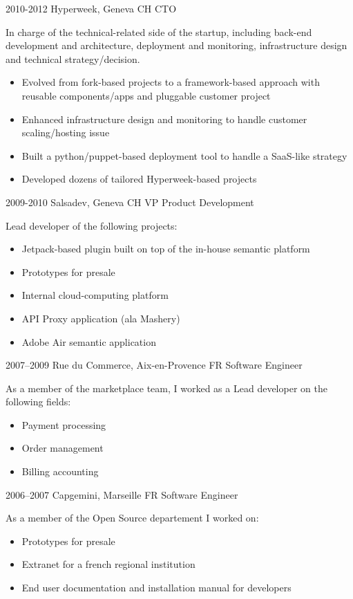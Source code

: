 \documentclass[]{friggeri}
\begin{document}
\begin{entrylist}
  \entry
    {2010-2012}
    {Hyperweek, Geneva CH}
    {\ac{CTO}}
    {In charge of the technical-related side of the startup, including
    back-end development and architecture, deployment and monitoring,
    infrastructure design and technical strategy/decision.
    \begin{itemize}
    \item Evolved from fork-based projects to a framework-based approach with
    reusable components/apps and pluggable customer project
    \item Enhanced infrastructure design and monitoring to handle customer
    scaling/hosting issue
    \item Built a python/puppet-based deployment tool to handle a SaaS-like
    strategy
    \item Developed dozens of tailored Hyperweek-based projects
    \end{itemize}}
  \entry
    {2009-2010}
    {Salsadev, Geneva CH}
    {VP Product Development}
    {Lead developer of the following projects:
    \begin{itemize}
    \item Jetpack-based plugin built on top of the in-house semantic platform
    \item Prototypes for presale
    \item Internal cloud-computing platform
    \item API Proxy application (ala Mashery)
    \item Adobe Air semantic application
    \end{itemize}}
  \entry
    {2007–2009}
    {Rue du Commerce, Aix-en-Provence FR}
    {Software Engineer}
    {As a member of the marketplace team, I worked as a Lead developer on the
    following fields:
    \begin{itemize}
    \item Payment processing
    \item Order management
    \item Billing accounting
    \end{itemize}}
  \entry
    {2006–2007}
    {Capgemini, Marseille FR}
    {Software Engineer}
    {As a member of the Open Source departement I worked on:
    \begin{itemize}
    \item Prototypes for presale
    \item Extranet for a french regional institution
    \item End user documentation and installation manual for developers

\end{itemize}}
\end{entrylist}
\end{document}
